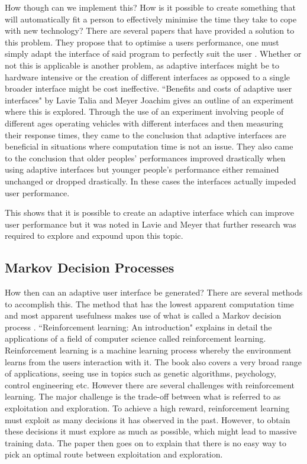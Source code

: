 \documentclass[11pt]{article}
\begin{document}
How though can we implement this? How is it possible to create something that will automatically fit a person to effectively minimise the time they take to cope with new technology? There are several papers that have provided a solution to this problem. They propose that to optimise a users performance, one must simply adapt the interface of said program to perfectly suit the user \citep{lavie2010benefits}. Whether or not this is applicable is another problem, as adaptive interfaces might be to hardware intensive or the creation of different interfaces as opposed to a single broader interface might be cost ineffective.
``Benefits and costs of adaptive user interfaces" by Lavie Talia and Meyer Joachim gives an outline of an experiment where this is explored. Through the use of an experiment involving people of different ages operating vehicles with different interfaces and then measuring their response times,
they came to the conclusion that adaptive interfaces are beneficial in situations where computation time is not an issue. They also came to the conclusion that older peoples' performances improved drastically when using adaptive interfaces but younger people's performance either remained unchanged or dropped drastically. In these cases the interfaces actually impeded user performance.
\vspace{6.0 mm}

This shows that it is possible to create an adaptive interface which can improve user performance but it was noted in Lavie and Meyer \citep{lavie2010benefits} that further research was required to explore and expound upon this topic. 
\vspace{6.0 mm}

\subsection{Markov Decision Processes}

How then can an adaptive user interface be generated? There are several methods to accomplish this. The method that has the lowest apparent computation time and most apparent usefulness makes use of what is called a Markov decision process \citep{sutton1998introduction}. ``Reinforcement learning: An introduction"  \citep{sutton1998introduction} explains in detail the applications of a field of computer science called reinforcement learning. Reinforcement learning is a machine learning process whereby the environment learns from the users interaction with it. The book also covers a very broad range of applications, seeing use in topics such as genetic algorithms, psychology, control engineering etc. However there are several challenges with reinforcement learning. The major challenge is the trade-off between what is referred to as exploitation and exploration. To achieve a high reward, reinforcement learning must exploit as many decisions it has observed in the past. However, to obtain these decisions it must explore as much as possible, which might lead to massive training data. The paper then goes on to explain that there is no easy way to pick an optimal route between exploitation and exploration.
\vspace{6.0 mm}
\end{document}
